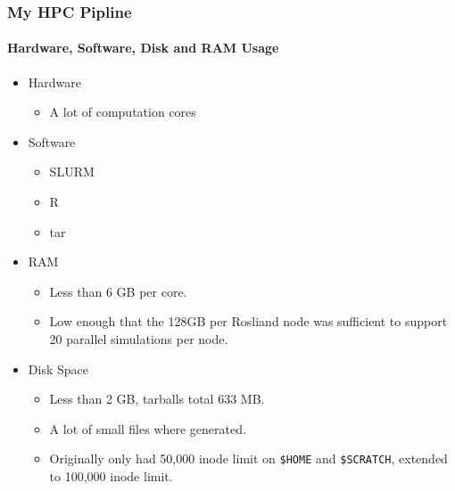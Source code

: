 \documentclass[10pt]{beamer}
\begin{document}
\begin{frame}
  \frametitle{My HPC Pipline}
  \framesubtitle{Hardware, Software, Disk and RAM Usage}
  \begin{itemize}
    \item Hardware
      \begin{itemize}
        \item A lot of computation cores
      \end{itemize}

    \item Software
      \begin{itemize}
        \item SLURM
        \item R
        \item tar
      \end{itemize}

    \item RAM
      \begin{itemize}
        \item Less than 6 GB per core.
        \item Low enough that the 128GB per Rosliand node was sufficient to
          support 20 parallel simulations per node.
      \end{itemize}

    \item Disk Space
      \begin{itemize}
        \item Less than 2 GB, tarballs total 633 MB.
        \item A lot of small files where generated.
        \item Originally only had 50,000 inode limit on {\tt \$HOME} and
          {\tt \$SCRATCH}, extended to 100,000 inode limit.
      \end{itemize}
  \end{itemize} 
\end{frame}
\end{document}
